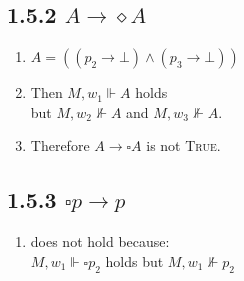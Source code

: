 \documentclass{report}
\begin{document}
		\subsection*{1.5.2 $A \rightarrow \diamond A$}
		\begin{enumerate}[]
			\item $A = ((p_2 \rightarrow \bot ) \wedge (p_3 \rightarrow \bot))$
			\item Then $M, w_1 \Vdash A$ holds \\
			but $M, w_2 \not \Vdash A$ and $M, w_3 \not \Vdash A$.
			\item Therefore $A \rightarrow \square A$ is not \textsc{True}.
		\end{enumerate}
		\subsection*{1.5.3 $\square p \rightarrow p$}
		\begin{enumerate}[]
			\item does not hold because: \\
			$M, w_1 \Vdash \square p_2$ holds but $M, w_1 \not \Vdash p_2$
		\end{enumerate}
\end{document}
